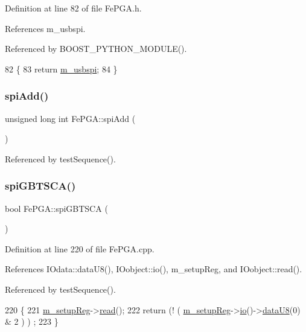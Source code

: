Definition at line 82 of file Fe\+P\+G\+A.\+h.



References m\+\_\+usbspi.



Referenced by B\+O\+O\+S\+T\+\_\+\+P\+Y\+T\+H\+O\+N\+\_\+\+M\+O\+D\+U\+L\+E().


\begin{DoxyCode}
82                     \{
83     \textcolor{keywordflow}{return} \hyperlink{classFePGA_a922a56250b29c9842cdb8095cae8c976}{m\_usbspi};
84   \}
\end{DoxyCode}
\mbox{\label{classFePGA_a721de3fa12e207392cd6156027d2c776}} 
\subsubsection{\texorpdfstring{spi\+Add()}{spiAdd()}}
{\footnotesize\ttfamily unsigned long int Fe\+P\+G\+A\+::spi\+Add (\begin{DoxyParamCaption}{ }\end{DoxyParamCaption})}



Referenced by test\+Sequence().

\mbox{\label{classFePGA_ad305543bda4d68fe181cd7fa614b2fe1}} 
\subsubsection{\texorpdfstring{spi\+G\+B\+T\+S\+C\+A()}{spiGBTSCA()}}
{\footnotesize\ttfamily bool Fe\+P\+G\+A\+::spi\+G\+B\+T\+S\+CA (\begin{DoxyParamCaption}{ }\end{DoxyParamCaption})}



Definition at line 220 of file Fe\+P\+G\+A.\+cpp.



References I\+Odata\+::data\+U8(), I\+Oobject\+::io(), m\+\_\+setup\+Reg, and I\+Oobject\+::read().



Referenced by test\+Sequence().


\begin{DoxyCode}
220                       \{
221   \hyperlink{classFePGA_a0255fe229013986b4387c3a75ddf4e97}{m\_setupReg}->\hyperlink{classIOobject_aa07610c11963b1db6710e3c76ceea456}{read}();
222   \textcolor{keywordflow}{return} (! ( \hyperlink{classFePGA_a0255fe229013986b4387c3a75ddf4e97}{m\_setupReg}->\hyperlink{classIOobject_af04fb94137c3d86849f478ac5afab5d1}{io}()->\hyperlink{classIOdata_a75e9c318dbac3a39402179070943d4bc}{dataU8}(0) & 2 ) ) ;
223 \}
\end{DoxyCode}
\mbox{\label{classFePGA_a637b93fed75b576a54e723acb36cb6a3}} 
